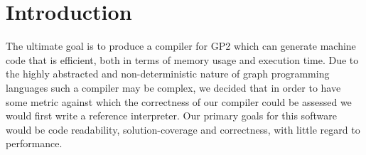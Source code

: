 \section{Introduction}


The ultimate goal is to produce a compiler for GP2 which can generate machine code that is efficient, both in terms of memory usage and execution time. Due to the highly abstracted and non-deterministic nature of graph programming languages such a compiler may be complex, we decided that in order to have some metric against which the correctness of our compiler could be assessed we would first write a reference interpreter. Our primary goals for this software would be code readability, solution-coverage and correctness, with little regard to performance.

